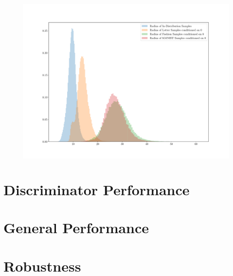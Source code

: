 \begin{figure}[htpb]
    \centering
    \includegraphics[width=0.8\linewidth]{figures/samples/emnist_radius_hist.pdf}
    \caption{}%
    \label{fig:}
\end{figure}


\section{Discriminator Performance}%
\label{sec:discriminator_performance}


\section{General Performance}%
\label{sec:general_performance}


\section{Robustness}%
\label{sec:robustness}


